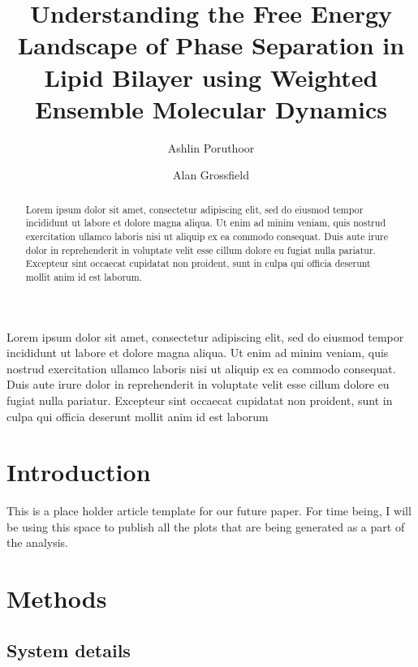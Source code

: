 \documentclass{biophys-new}
\title{Understanding the Free Energy Landscape of Phase Separation in Lipid Bilayer using Weighted Ensemble Molecular Dynamics}
\author[1]{Ashlin Poruthoor}
\author[1,*]{Alan Grossfield}
\affil[1]{University of Rochester Medical Center, Rochester, NY 14620}
\begin{document}
\begin{frontmatter}
\begin{abstract}

Lorem ipsum dolor sit amet, consectetur adipiscing elit, sed do eiusmod tempor incididunt ut labore et dolore magna aliqua. Ut enim ad minim veniam, quis nostrud exercitation ullamco laboris nisi ut aliquip ex ea commodo consequat. Duis aute irure dolor in reprehenderit in voluptate velit esse cillum dolore eu fugiat nulla pariatur. Excepteur sint occaecat cupidatat non proident, sunt in culpa qui officia deserunt mollit anim id est laborum.

\end{abstract}

\begin{sigstatement}

Lorem ipsum dolor sit amet, consectetur adipiscing elit, sed do eiusmod tempor incididunt ut labore et dolore magna aliqua. Ut enim ad minim veniam, quis nostrud exercitation ullamco laboris nisi ut aliquip ex ea commodo consequat. Duis aute irure dolor in reprehenderit in voluptate velit esse cillum dolore eu fugiat nulla pariatur. Excepteur sint occaecat cupidatat non proident, sunt in culpa qui officia deserunt mollit anim id est laborum

\end{sigstatement}

\end{frontmatter}

\section*{Introduction}

This is a place holder article template for our future paper. For time being, I will be using this 
space to publish all the plots that are being generated as a part of the analysis.

\section*{Methods}

\subsection*{System details}
\end{document}
